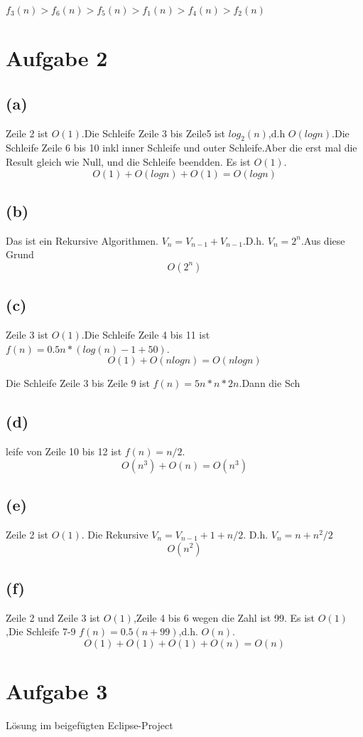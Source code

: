 \documentclass{article}
\begin{document}
$f_3(n)>f_6(n)>f_5(n)>f_1(n)>f_4(n)>f_2(n)$

\section{Aufgabe 2}
\subsection*{(a)}
    Zeile 2 ist $O(1)$.Die Schleife Zeile 3 bis Zeile5 ist $log_2(n)$,d.h $O(logn)$.Die Schleife Zeile 6 bis 10 inkl inner Schleife und outer Schleife.Aber die erst mal die Result gleich wie Null, und die Schleife beendden. Es ist $O(1)$. \\
    \[O(1)+O(logn)+O(1)=O(logn)\]
\subsection*{(b)}
    Das ist ein Rekursive Algorithmen. $V_n=V_{n-1}+V_{n-1}$.D.h. $V_n=2^n$.Aus diese Grund 
    \[O(2^n)\]
\subsection*{(c)}
    Zeile 3 ist $O(1)$.Die Schleife Zeile 4 bis 11 ist $f(n)=0.5n*(log(n)-1+50)$.\\
    \[O(1)+O(nlogn)=O(nlogn)\]

    Die Schleife Zeile 3 bis Zeile 9 ist $f(n)=5n*n*2n$.Dann die Sch\subsection*{(d)}leife von Zeile 10 bis 12 ist $f(n)=n/2$.
    \[O(n^3)+O(n)=O(n^3)\]
\subsection*{(e)}
Zeile 2 ist $O(1)$. Die Rekursive $V_n=V_{n-1}+1+n/2$. D.h. $V_n=n+n^2/2$
\[O(n^2)\]
\subsection*{(f)}
Zeile 2 und Zeile 3 ist $O(1)$,Zeile 4 bis 6 wegen die Zahl ist 99. Es ist $O(1)$,Die Schleife 7-9 $f(n)=0.5(n+99)$,d.h. $O(n)$.
\[O(1)+O(1)+O(1)+O(n)=O(n)\]
\section{Aufgabe 3}
Lösung im beigefügten Eclipse-Project
\end{document}
